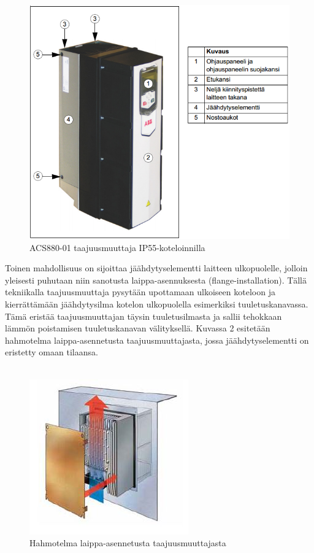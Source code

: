 \documentclass[finnish,12pt,a4paper,pdftex,elec,utf8]{aaltothesis}
\begin{document}
\begin{figure}[H]
	\begin{center}
	\includegraphics[scale=0.9]{IP55}
	\end{center}
	\caption{ACS880-01 taajuusmuuttaja IP55-koteloinnilla
		\cite[s.28]{880hwman}}
	\label{fig:IP55}
\end{figure}
Toinen mahdollisuus on sijoittaa jäähdytyselementti laitteen ulkopuolelle, jolloin yleisesti puhutaan niin sanotusta laippa-asennuksesta (flange-installation). Tällä tekniikalla taajuusmuuttaja pysytään upottamaan ulkoiseen koteloon ja kierrättämään jäähdytysilma kotelon ulkopuolella esimerkiksi tuuletuskanavassa. Tämä eristää taajuusmuuttajan täysin tuuletusilmasta ja sallii tehokkaan lämmön poistamisen tuuletuskanavan välityksellä. Kuvassa 2 esitetään hahmotelma laippa-asennetusta taajuusmuuttajasta, jossa jäähdytyselementti on eristetty omaan tilaansa.
\\\\
\begin{figure}[H]
	\begin{center}
	\includegraphics{flange}
	\end{center}
	\caption{Hahmotelma laippa-asennetusta taajuusmuuttajasta
		\cite[s.6]{danfoss}}
	\label{fig:flange}
\end{figure}
\end{document}
